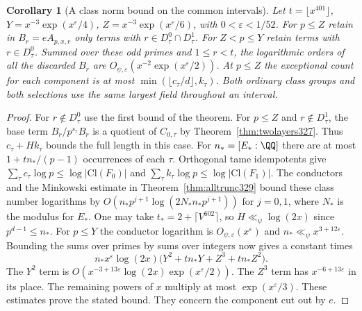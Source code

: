 \documentclass[a4paper,11pt]{article}
\newtheorem{corollary}[proposition]{Corollary}
\theoremstyle{definition}
\theoremstyle{remark}
\numberwithin{equation}{section}
\begin{document}
\begin{corollary}[A class norm bound on the common intervals]\leavevmode\label{cor:normbudget340}
Let $t=\lfloor x^{401}\rfloor$, $Y=x^{-3}\exp(x^\varepsilon/4)$,
$Z=x^{-3}\exp(x^\varepsilon/6)$, with $0<\varepsilon<1/52$.
For $p\le Z$ retain in $B_r=eA_{p,x,r}$ only terms with
$r\in D^0_\tau\cap D^1_\tau$. For $Z<p\le Y$ retain terms with
$r\in D^0_\tau$. Summed over these odd primes and $1\le r<t$, the
logarithmic orders of all the discarded $B_r$ are
$O_{\psi,\varepsilon}(x^{-2}\exp(x^\varepsilon/2))$.
At $p\le Z$ the exceptional count for each component is at most
$\min(\lfloor c_\tau/d\rfloor,k_\tau)$. Both ordinary class groups
and both selections use the same largest field throughout an interval.
\end{corollary}
\begin{proof}
For $r\notin D^0_\tau$ use the first bound of the theorem. For
$p\le Z$ and $r\notin D^1_\tau$, the base term $B_r/p^{s_r}B_r$
is a quotient of $C_{0,\tau}$ by Theorem~\ref{thm:twolayers327}.
Thus $c_\tau+Hk_\tau$ bounds the full length in this case. For
$n_*=[E_*:\QQ]$ there are at most $1+tn_* /(p-1)$ occurrences
of each $\tau$. Orthogonal tame idempotents give
$\sum_\tau c_\tau\log p\le\log|\mathrm{Cl}(F_0)|$ and
$\sum_\tau k_\tau\log p\le\log|\mathrm{Cl}(F_1)|$. The conductors
and the Minkowski estimate in Theorem~\ref{thm:alltrunc329} bound
these class number logarithms by $O(n_*p^{j+1}\log(2N_*n_*p^{j+1}))$
for $j=0,1$, where $N_*$ is the modulus for $E_*$. One may take
$t_*=2+\lceil V^{602}\rceil$, so $H\ll_\psi\log(2x)$ since
$p^{d-1}\le n_*$. For $p\le Y$ the conductor logarithm is
$O_{\psi,\varepsilon}(x^\varepsilon)$ and
$n_*\ll_\psi x^{3+12\varepsilon}$. Bounding the sums over primes
by sums over integers now gives a constant times
\[
 n_*x^\varepsilon\log(2x)
       \bigl(Y^2+tn_*Y+Z^3+tn_*Z^2\bigr).
\]
The $Y^2$ term is $O(x^{-3+13\varepsilon}\log(2x)\exp(x^\varepsilon/2))$.
The $Z^3$ term has $x^{-6+13\varepsilon}$ in its place. The remaining
powers of $x$ multiply at most $\exp(x^\varepsilon/3)$. These estimates
prove the stated bound. They concern the component cut out by $e$.
\end{proof}
\end{document}
